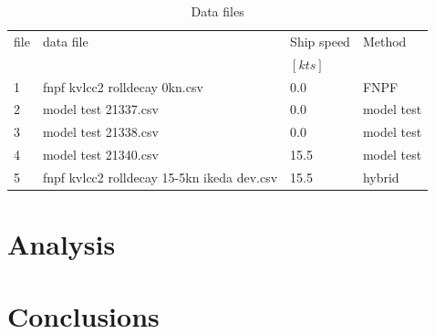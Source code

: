 \documentclass[11pt]{article}
\begin{document}
    

    
    
\begin{table}[H]
\scriptsize
\center
\caption{Data files}
\label{tab:data_files}
\begin{tabular}{|l|l|l|l|}
\hline\addlinespace
file & data file & Ship speed & Method\\ 
 &  & $[kts]$ & \\ 
\hline1 & fnpf kvlcc2 rolldecay 0kn.csv & 0.0 & FNPF\\ 
2 & model test 21337.csv & 0.0 & model test\\ 
3 & model test 21338.csv & 0.0 & model test\\ 
4 & model test 21340.csv & 15.5 & model test\\ 
5 & fnpf kvlcc2 rolldecay 15-5kn ikeda dev.csv & 15.5 & hybrid\\ 

\hline
\end{tabular}
\end{table}

    

    \hypertarget{analysis}{%
\section{Analysis}\label{analysis}}

    \hypertarget{conclusions}{%
\section{Conclusions}\label{conclusions}}


    
    
    
\end{document}
